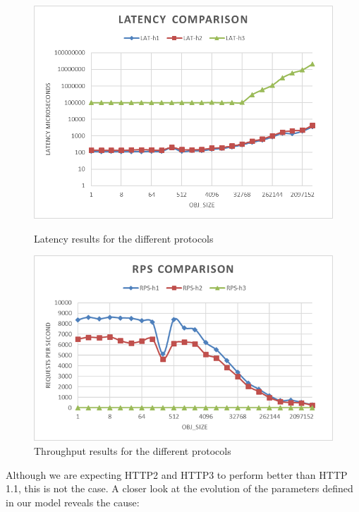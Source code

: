 \documentclass[runningheads]{llncs}
\begin{document}
\begin{figure}[H]
    \centering
    \begin{minipage}{0.49\textwidth}
        \centering
        \includegraphics[width=1\textwidth]{lat-h2load-mistral.png}
        \caption{Latency results for the different protocols}
		\label {fig:lat-comp-mistral}
    \end{minipage}\hfill
    \begin{minipage}{0.49\textwidth}
        \centering
        \includegraphics[width=1\textwidth]{rps-h2load-mistral.png}
        \caption{Throughput results for the different protocols}
		\label {fig:rps-comp-mistral}
    \end{minipage}
\end{figure}


Although we are expecting HTTP2 and HTTP3 to perform better than HTTP 1.1, this is not the case. A closer look at the evolution of the parameters defined in our model reveals the cause:
\end{document}
